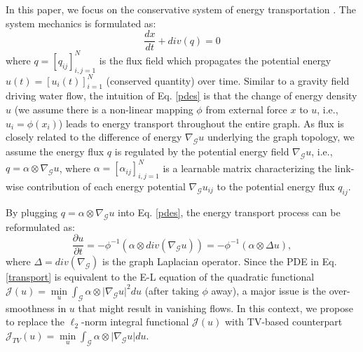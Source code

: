\documentclass{article}
\begin{document}
In this paper, we focus on the conservative system of energy transportation \cite{arnol2013mathematical}. The system mechanics is formulated as:
\begin{equation}
\label{pdes}
  \frac{{dx}}{{dt}} + div(q) = 0
\end{equation}
where $q=[q_{ij}]_{i,j=1}^N$ is the flux field which propagates the potential energy $u(t)=[u_i(t)]_{i=1}^N$ (conserved quantity) over time. Similar to a gravity field driving water flow, the intuition of Eq. \ref{pdes} is that the change of energy density $u$ (we assume there is a non-linear mapping $\phi$ from external force $x$ to $u$, i.e., $u_i=\phi (x_i)$) leads to energy transport throughout the entire graph. As flux is closely related to the difference of energy $\nabla_{\mathcal{G}}u$ underlying the graph topology, we assume the energy flux $q$ is regulated by the potential energy field $\nabla_{\mathcal{G}}u$, i.e., $q=\alpha \otimes \nabla_{\mathcal{G}}u$, where $\alpha=[\alpha_{ij}]_{i,j=1}^N$ is a learnable matrix characterizing the link-wise contribution of each energy potential $\nabla_{\mathcal{G}}u_{ij}$ to the potential energy flux $q_{ij}$.

By plugging $q=\alpha \otimes \nabla_{\mathcal{G}}u$ into Eq. \ref{pdes}, the energy transport process can be reformulated as:
\begin{equation}
\label{transport}
  \frac{{\partial u}}{{\partial t}} = - \phi^{-1} (\alpha \otimes div(\nabla_{\mathcal{G}}u)) = - \phi^{-1} (\alpha \otimes \Delta u),
\end{equation}
where $\Delta=div(\nabla_{\mathcal{G}})$ is the graph Laplacian operator. Since the PDE in Eq. \ref{transport} is equivalent to the E-L equation of the quadratic functional $\mathcal{J}(u)= \mathop {\min }\limits_u \int_\mathcal{G}  \alpha \otimes | \nabla_{\mathcal{G}} u{|^2}du$ (after taking $\phi$ away), a major issue is the over-smoothness in $u$ that might result in vanishing flows. In this context, we propose to replace the ${\ell _2}$-norm integral functional $\mathcal{J}(u)$ with TV-based counterpart $\mathcal{J}_{TV}(u)=\mathop {\min }\limits_u \int_\mathcal{G} \alpha \otimes | \nabla_{\mathcal{G}} u{|}du$.
\end{document}

